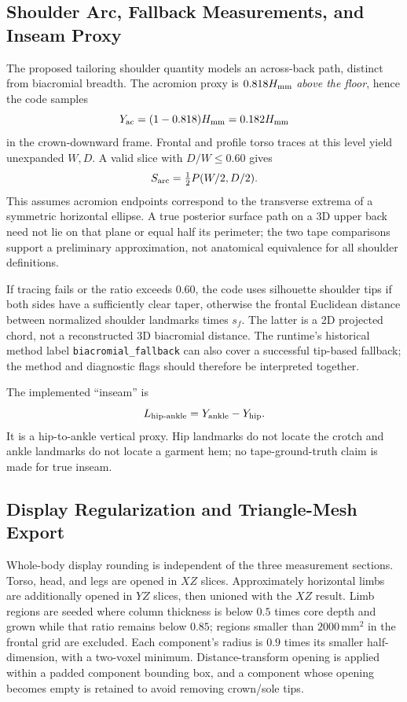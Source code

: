 \documentclass[journal]{IEEEtran}
\begin{document}
\subsection{Shoulder Arc, Fallback Measurements, and Inseam Proxy}
\label{subsec:shoulder_arc}
The proposed tailoring shoulder quantity models an across-back path, distinct from biacromial breadth. The acromion proxy is $0.818H_{\rm mm}$ \emph{above the floor}, hence the code samples
\begin{equation}
Y_{\rm ac}=(1-0.818)H_{\rm mm}=0.182H_{\rm mm}
\end{equation}
in the crown-downward frame. Frontal and profile torso traces at this level yield unexpanded $W,D$. A valid slice with $D/W\le0.60$ gives
\begin{equation}
S_{\rm arc}=\tfrac12P(W/2,D/2).
\label{eq:shoulder_arc}
\end{equation}
This assumes acromion endpoints correspond to the transverse extrema of a symmetric horizontal ellipse. A true posterior surface path on a 3D upper back need not lie on that plane or equal half its perimeter; the two tape comparisons support a preliminary approximation, not anatomical equivalence for all shoulder definitions.

If tracing fails or the ratio exceeds $0.60$, the code uses silhouette shoulder tips if both sides have a sufficiently clear taper, otherwise the frontal Euclidean distance between normalized shoulder landmarks times $s_f$. The latter is a 2D projected chord, not a reconstructed 3D biacromial distance. The runtime's historical method label \texttt{biacromial\_fallback} can also cover a successful tip-based fallback; the method and diagnostic flags should therefore be interpreted together.

\label{subsec:linear_measurements}
The implemented ``inseam'' is
\begin{equation}
L_{\rm hip\text{-}ankle}=Y_{\rm ankle}-Y_{\rm hip}.
\end{equation}
It is a hip-to-ankle vertical proxy. Hip landmarks do not locate the crotch and ankle landmarks do not locate a garment hem; no tape-ground-truth claim is made for true inseam.

\subsection{Display Regularization and Triangle-Mesh Export}
\label{subsec:mesh_export}
Whole-body display rounding is independent of the three measurement sections. Torso, head, and legs are opened in $XZ$ slices. Approximately horizontal limbs are additionally opened in $YZ$ slices, then unioned with the $XZ$ result. Limb regions are seeded where column thickness is below $0.5$ times core depth and grown while that ratio remains below $0.85$; regions smaller than $2000$\,mm$^2$ in the frontal grid are excluded. Each component's radius is $0.9$ times its smaller half-dimension, with a two-voxel minimum. Distance-transform opening is applied within a padded component bounding box, and a component whose opening becomes empty is retained to avoid removing crown/sole tips.
\end{document}
